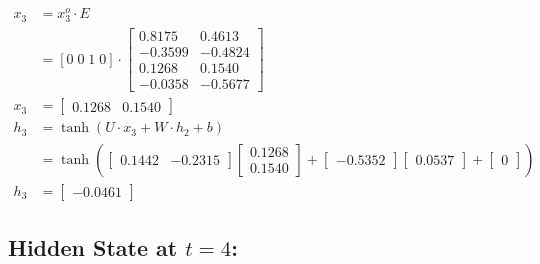 \documentclass{article}
\begin{document}
\begin{align*}
 x_3 & = x^o_3 \cdot E \\
    & =  [0 \; 0\; 1\; 0] \cdot \begin{bmatrix}
  0.8175 & 0.4613 \\
 -0.3599 & -0.4824 \\
  0.1268 & 0.1540 \\
 -0.0358 & -0.5677
\end{bmatrix} \\
    x_3 & = \begin{bmatrix}
  0.1268 & 0.1540
\end{bmatrix}\\
h_3 &= \tanh(U \cdot x_3 + W \cdot h_2 + b) \\
&= \tanh\left(\begin{bmatrix}
0.1442 & -0.2315
\end{bmatrix} \begin{bmatrix}
0.1268 \\ 0.1540
\end{bmatrix} + \begin{bmatrix}
-0.5352
\end{bmatrix} \begin{bmatrix}
0.0537
\end{bmatrix} + \begin{bmatrix}
0
\end{bmatrix}\right) \\
h_3 &= \begin{bmatrix}
-0.0461
\end{bmatrix}
\end{align*}

\subsection{Hidden State at \(t=4\):}
\end{document}
